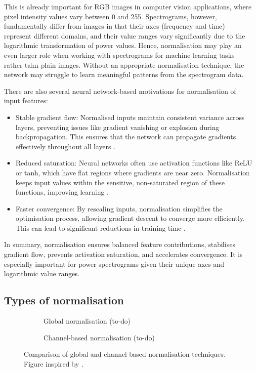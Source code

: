 This is already important for RGB images in computer vision applications, where pixel intensity values vary between 0 and 255. Spectrograms, however, fundamentally differ from images in that their axes (frequency and time) represent different domains, and their value ranges vary significantly due to the logarithmic transformation of power values. Hence, normalisation may play an even larger role when working with spectrograms for machine learning tasks rather tahn plain images. Without an appropriate normalisation technique, the network may struggle to learn meaningful patterns from the spectrogram data.

There are also several neural network-based motivations for normalisation of input features:
\begin{itemize}
    \item Stable gradient flow: Normalised inputs maintain consistent variance across layers, preventing issues like gradient vanishing or explosion during backpropagation. This ensures that the network can propagate gradients effectively throughout all layers \cite{glorot_understanding_2010, wu_group_2018}.
    \item Reduced saturation: Neural networks often use activation functions like ReLU or tanh, which have flat regions where gradients are near zero. Normalisation keeps input values within the sensitive, non-saturated region of these functions, improving learning \cite{glorot_understanding_2010}.
    \item Faster convergence: By rescaling inputs, normalisation simplifies the optimisation process, allowing gradient descent to converge more efficiently. This can lead to significant reductions in training time \cite{montavon_efficient_2012}.
\end{itemize}

In summary, normalisation ensures balanced feature contributions, stabilises gradient flow, prevents activation saturation, and accelerates convergence. It is especially important for power spectrograms given their unique axes and logarithmic value ranges.

\subsection{Types of normalisation}

\begin{figure}[htbp]
    \centering
    \begin{subfigure}[b]{0.45\textwidth}
        \centering
        \caption{Global normalisation (to-do)}
    \end{subfigure}
    \hfill
    \begin{subfigure}[b]{0.45\textwidth}
        \centering
        \caption{Channel-based normalisation (to-do)}
    \end{subfigure}
    \caption{Comparison of global and channel-based normalisation techniques. Figure inspired by \cite[Fig. 2]{wu_group_2018}.}
    \label{fig:normalisation-comparison-cube}
\end{figure}


